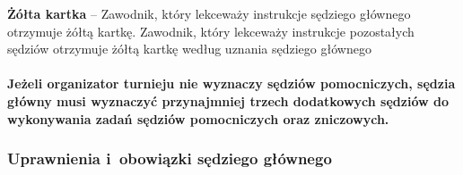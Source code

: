 \documentclass[12pt,a4paper]{article}
\newcommand\yellowcard[1]{\bgroup\textcolor{darkyellow}{\textbf{#1}}}
\begin{document}
\yellowcard{Żółta kartka} -- Zawodnik, który lekceważy instrukcje sędziego
głównego otrzymuje żółtą kartkę. Zawodnik, który lekceważy instrukcje
pozostałych sędziów otrzymuje żółtą kartkę według uznania sędziego
głównego

\paragraph{Jeżeli organizator turnieju nie wyznaczy sędziów
	pomocniczych, sędzia główny musi wyznaczyć przynajmniej trzech
	dodatkowych sędziów do wykonywania zadań sędziów pomocniczych oraz
	zniczowych.}

\subsubsection{Uprawnienia i~obowiązki sędziego głównego}
\end{document}
